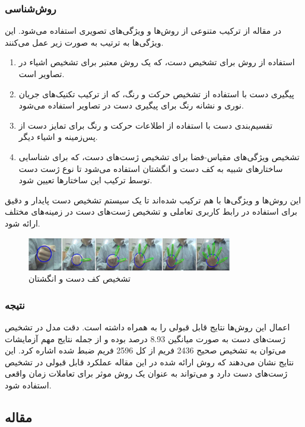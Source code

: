 \subsubsection{روش‌شناسی}
در مقاله از ترکیب متنوعی از روش‌ها و ویژگی‌های تصویری استفاده می‌شود. این ویژگی‌ها به ترتیب به صورت زیر عمل می‌کنند.
\begin{enumerate}
    \item استفاده از روش  برای تشخیص دست، که یک روش معتبر برای تشخیص اشیاء در تصاویر است.
    \item پیگیری دست با استفاده از تشخیص حرکت و رنگ، که از ترکیب تکنیک‌های جریان نوری و نشانه رنگ برای پیگیری دست در تصاویر استفاده می‌شود.
    \item تقسیم‌بندی دست با استفاده از اطلاعات حرکت و رنگ برای تمایز دست از پس‌زمینه و اشیاء دیگر. 
    \item تشخیص ویژگی‌های مقیاس-فضا برای تشخیص ژست‌های دست، که برای شناسایی ساختارهای شبیه به کف دست و انگشتان استفاده می‌شود تا نوع ژست دست توسط ترکیب این ساختارها تعیین شود.
\end{enumerate}
  این روش‌ها و ویژگی‌ها با هم ترکیب شده‌اند تا یک سیستم تشخیص دست پایدار و دقیق برای استفاده در رابط کاربری تعاملی و تشخیص ژست‌های دست در زمینه‌های مختلف ارائه شود.

\begin{figure}[h]
    \centering
    \includegraphics[width=0.8\textwidth]{hand_gesture_feature.png}
    \caption{تشخیص کف دست و انگشتان}
\end{figure}

\subsubsection{نتیجه}
اعمال این روش‌ها نتایج قابل قبولی را به همراه داشته است. دقت مدل در تشخیص ژست‌های دست به صورت میانگین 8.93 درصد بوده و از جمله نتایج مهم آزمایشات می‌توان به تشخیص 
صحیح 2436 فریم از کل 2596 فریم ضبط شده اشاره کرد. این نتایج نشان می‌دهند که روش ارائه شده در این مقاله عملکرد قابل قبولی در تشخیص ژست‌های دست دارد و 
می‌تواند به عنوان یک روش موثر برای تعاملات زمان واقعی استفاده شود.
\cite{fang2007real}


\subsection{مقاله }

